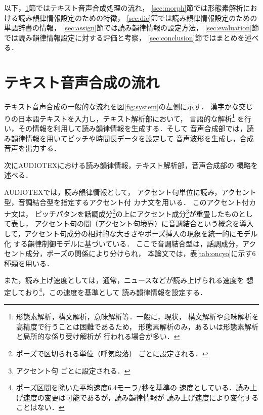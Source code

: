 以下，\ref{sec:TTS-flow}節ではテキスト音声合成処理の流れ，
\mbox{\ref{sec:morph}節では形態素解析における読み韻律情報設定}のための特徴，
\ref{sec:dic}節では読み韻律情報設定のための単語辞書の情報，
\ref{sec:assign}節では読み韻律情報の設定方法，
\ref{sec:evaluation}節では読み韻律情報設定に対する評価と考察，
\ref{sec:conclusion}節ではまとめを述べる．

\section{テキスト音声合成の流れ}\label{sec:TTS-flow}
テキスト音声合成の一般的な流れを図\ref{fig:system}の左側に示す．
漢字かな交じりの日本語テキストを入力し，テキスト解析部において，
言語的な解析\footnote{形態素解析，構文解析，意味解析等．一般に，現状，
構文解析や意味解析を高精度で行うことは困難であるため，
形態素解析のみ，あるいは形態素解析と局所的な係り受け解析が
行われる場合が多い．}
を行い，その情報を利用して読み韻律情報を生成する．そして
音声合成部では，読み韻律情報を用いてピッチや時間長データを設定して
音声波形を生成し，合成音声を出力する．

\begin{figure*}[tb]
\begin{center}
\end{center}
\caption{テキスト音声合成処理の流れ}
\label{fig:system}
\end{figure*}

次にAUDIOTEXにおける読み韻律情報，テキスト解析部，音声合成部の
概略を述べる．

AUDIOTEXでは，読み韻律情報として，
アクセント句単位に読み，アクセント型，音調結合型を指定するアクセント付
カナ文を用いる．
このアクセント付カナ文は，
ピッチパタンを話調成分\footnote{ポーズで区切られる単位（呼気段落）
ごとに設定される．}の上にアクセント成分\footnote{アクセント句
ごとに設定される．}が重畳したものとして表し，
アクセント句の間（アクセント句境界）に音調結合という概念を導入
して，アクセント句成分の相対的な大きさやポーズ挿入の現象を統一的にモデル化
する韻律制御モデル\cite{Hakoda1}に基づいている．
ここで音調結合型は，話調成分，アクセント成分，ポーズの関係により分けられ，
本論文では，表\ref{tab:oncyo}に示す6種類を用いる．

また，読み上げ速度としては，通常，ニュースなどが読み上げられる速度を
想定しており\footnote{ポーズ区間を除いた平均速度6.4モーラ/秒を基準の
\mbox{速度としている．読み上げ速度の変更は可能であるが，読み韻律情}報が
読み上げ速度により変化することはない．}，この速度を基準として
読み韻律情報を設定する．

